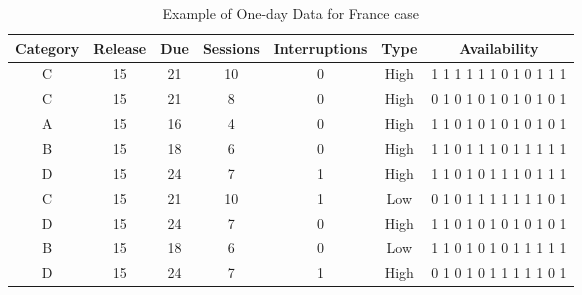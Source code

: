  \begin{table}[h]
\begin{tabular}{|c|c|c|c|c|c|c|}
\hline
Category & Release & Due & Sessions & Interruptions & Type & Availability \\ \hline
C        & 15      & 21  & 10       & 0    & High       & 1 1 1 1 1 1 0 1 0 1 1 1 \\ \hline
C        & 15      & 21  & 8        & 0    & High       & 0 1 0 1 0 1 0 1 0 1 0 1 \\ \hline
A        & 15      & 16  & 4        & 0    & High       & 1 1 0 1 0 1 0 1 0 1 0 1 \\ \hline
B        & 15      & 18  & 6        & 0    & High       & 1 1 0 1 1 1 0 1 1 1 1 1 \\ \hline
D        & 15      & 24  & 7        & 1    & High       & 1 1 0 1 0 1 1 1 0 1 1 1 \\ \hline
C        & 15      & 21  & 10       & 1    & Low        & 0 1 0 1 1 1 1 1 1 1 0 1 \\ \hline
D        & 15      & 24  & 7        & 0    & High       & 1 1 0 1 0 1 0 1 0 1 0 1 \\ \hline
B        & 15      & 18  & 6        & 0    & Low        & 1 1 0 1 0 1 0 1 1 1 1 1 \\ \hline
D        & 15      & 24  & 7        & 1    & High       & 0 1 0 1 0 1 1 1 1 1 0 1 \\ \hline
\end{tabular}
\caption{Example of One-day Data for France case}\label{table-france}
\end{table}